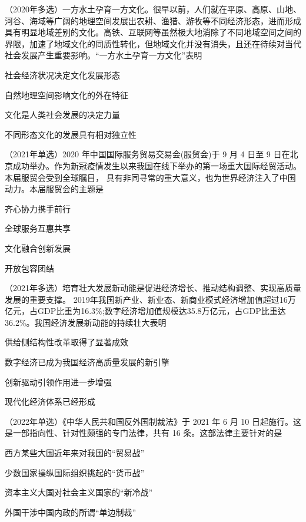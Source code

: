 \documentclass[lang=cn,newtx,10pt,scheme=chinese,pad,twocol]{zznote}
\begin{document}
\begin{example}	（2020年多选）一方水土孕育一方文化。很早以前，人们就在平原、高原、山地、河谷、海域等广阔的地理空间发展出农耕、渔猎、游牧等不同经济形态，进而形成具有明显地域差别的文化。高铁、互联网等虽然极大地消除了不同地域空间之间的界限，加速了地域文化的同质性转化，但地域文化并没有消失，且还在待续对当代社会发展产生重要影响。“一方水土孕育一方文化”表明
	\begin{choice}
		\item 社会经济状况决定文化发展形态
		\item 自然地理空间影响文化的外在特征
		\item 文化是人类社会发展的决定力量
		\item 不同形态文化的发展具有相对独立性
	\end{choice}
\end{example}



\begin{example}
	（2021年单选）2020 年中国国际服务贸易交易会(服贸会)于 9 月 4 日至 9 日在北京成功举办。作为新冠疫情发生以来我国在线下举办的第一场重大国际经贸活动。本届服贸会受到全球瞩目， 具有非同寻常的重大意义，也为世界经济注入了中国动力。本届服贸会的主题是
	\begin{choice}
		\item 齐心协力携手前行
		\item 全球服务互惠共享
		\item 文化融合创新发展
		\item 开放包容团结
	\end{choice}
\end{example}


\begin{example}
	（2021年多选）培育壮大发展新动能是促进经济增长、推动结构调整、实现高质量发展的重要支撑。
	2019年我国新产业、新业态、新商业模式经济增加值超过16万亿元，占GDP比重为16.3\%;数字经济增加值规模达35.8万亿元，占GDP比重达36.2\%。我国经济发展新动能的持续壮大表明
	\begin{choice}
		\item 供给侧结构性改革取得了显著成效
		\item 数字经济已成为我国经济高质量发展的新引擎
		\item 创新驱动引领作用进一步增强
		\item 现代化经济体系已经形成
	\end{choice}

\end{example}


\begin{example} （2022年单选）《中华人民共和国反外国制裁法》于 2021 年 6 月 10 日起施行。这是一部指向性、针对性颇强的专门法律，共有 16 条。这部法律主要针对的是
	\begin{choice}
		\item 西方某些大国近年来对我国的“贸易战”
		\item 少数国家操纵国际组织挑起的“货币战”
		\item 资本主义大国对社会主义国家的“新冷战”
		\item 外国干涉中国内政的所谓“单边制裁”
	\end{choice}
\end{example}
\end{document}
